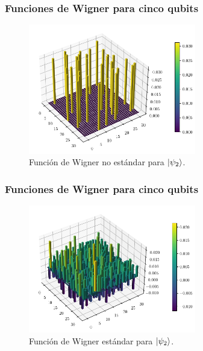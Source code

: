\documentclass[10pt, spanish]{beamer}
\begin{document}
  \begin{frame}
    \frametitle{Funciones de Wigner para cinco qubits}

    \begin{figure}[h]
      \centering
      \includegraphics[width=0.65\textwidth]{
      imgs/wigner-kantor-2-5-s2.png}
      \caption{Función de Wigner no estándar para
      $\ket{\psi_2}$.}
      \label{fig:wigner-kantor-2-5-s2}
    \end{figure}
  \end{frame}

  \begin{frame}
    \frametitle{Funciones de Wigner para cinco qubits}

    \begin{figure}[h]
      \centering
      \includegraphics[width=0.65\textwidth]{
      imgs/wigner-standard-2-5-s2.png}
      \caption{Función de Wigner estándar para
      $\ket{\psi_2}$.}
      \label{fig:wigner-standard-2-5-s2}
    \end{figure}
  \end{frame}
\end{document}
